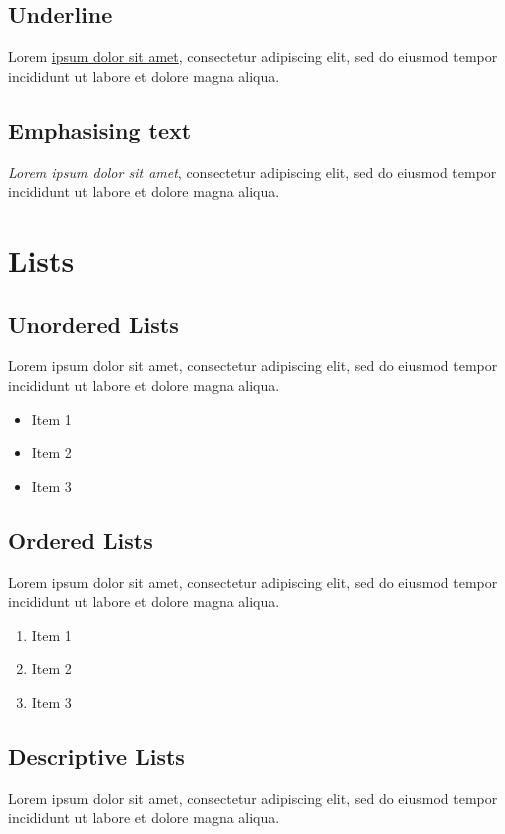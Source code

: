 \documentclass[a4paper, 12pt]{report}
\begin{document}
\section{Underline}
Lorem \underline{ipsum dolor sit amet}, consectetur adipiscing elit, sed do eiusmod tempor incididunt ut labore et dolore magna aliqua.

\section{Emphasising text}
\emph{Lorem ipsum dolor sit amet}, consectetur adipiscing elit, sed do eiusmod tempor incididunt ut labore et dolore magna aliqua.



\chapter{Lists}
\section{Unordered Lists}
Lorem ipsum dolor sit amet, consectetur adipiscing elit, sed do eiusmod tempor incididunt ut labore et dolore magna aliqua.

\begin{itemize}
	\item Item 1
	\item Item 2
	\item Item 3
\end{itemize}

\section{Ordered Lists}
Lorem ipsum dolor sit amet, consectetur adipiscing elit, sed do eiusmod tempor incididunt ut labore et dolore magna aliqua.

\begin{enumerate}
	\item Item 1
	\item Item 2
	\item Item 3
\end{enumerate}

\section{Descriptive Lists}
Lorem ipsum dolor sit amet, consectetur adipiscing elit, sed do eiusmod tempor incididunt ut labore et dolore magna aliqua.
\end{document}
